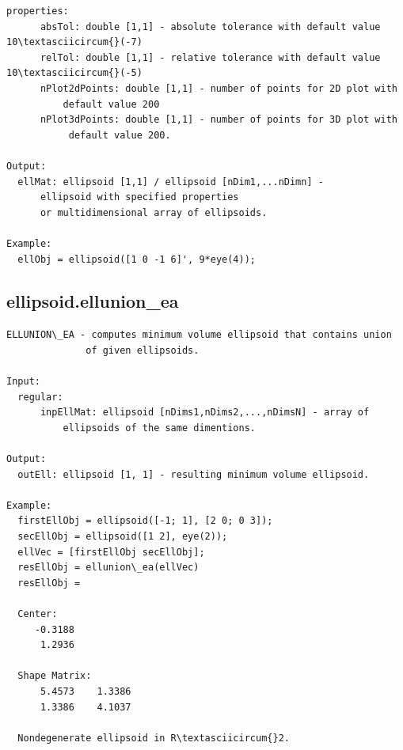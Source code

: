 \documentclass[letterpaper,10pt,english]{sphinxmanual}
\begin{document}
\begin{Verbatim}[commandchars=\\\{\}]
  properties:
      absTol: double [1,1] - absolute tolerance with default value 10\textasciicircum{}(-7)
      relTol: double [1,1] - relative tolerance with default value 10\textasciicircum{}(-5)
      nPlot2dPoints: double [1,1] - number of points for 2D plot with
          default value 200
      nPlot3dPoints: double [1,1] - number of points for 3D plot with
           default value 200.

Output:
  ellMat: ellipsoid [1,1] / ellipsoid [nDim1,...nDimn] -
      ellipsoid with specified properties
      or multidimensional array of ellipsoids.

Example:
  ellObj = ellipsoid([1 0 -1 6]', 9*eye(4));
\end{Verbatim}


\subsection{ellipsoid.ellunion\_ea}
\label{chap_functions:ellipsoid-ellunion-ea}
\begin{Verbatim}[commandchars=\\\{\}]
ELLUNION\_EA - computes minimum volume ellipsoid that contains union
              of given ellipsoids.

Input:
  regular:
      inpEllMat: ellipsoid [nDims1,nDims2,...,nDimsN] - array of
          ellipsoids of the same dimentions.

Output:
  outEll: ellipsoid [1, 1] - resulting minimum volume ellipsoid.

Example:
  firstEllObj = ellipsoid([-1; 1], [2 0; 0 3]);
  secEllObj = ellipsoid([1 2], eye(2));
  ellVec = [firstEllObj secEllObj];
  resEllObj = ellunion\_ea(ellVec)
  resEllObj =

  Center:
     -0.3188
      1.2936

  Shape Matrix:
      5.4573    1.3386
      1.3386    4.1037

  Nondegenerate ellipsoid in R\textasciicircum{}2.
\end{Verbatim}
\end{document}
